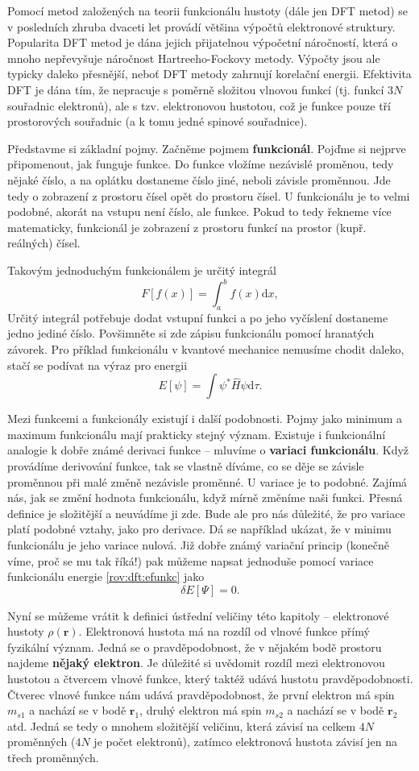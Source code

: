 Pomocí metod založených na teorii funkcionálu hustoty (dále jen DFT metod) se v posledních zhruba dvaceti let provádí většina výpočtů elektronové struktury. Popularita DFT metod je dána jejich přijatelnou výpočetní náročností, která o mnoho nepřevyšuje náročnost Hartreeho-Fockovy 
metody. Výpočty jsou ale typicky daleko přesnější, neboť DFT metody zahrnují korelační energii. Efektivita DFT je dána tím, že nepracuje s poměrně složitou vlnovou funkcí (tj. funkcí 3$N$ souřadnic elektronů), ale s tzv. elektronovou hustotou, což je funkce pouze tří prostorových souřadnic (a k tomu jedné spinové souřadnice). 

Představme si základní pojmy. Začněme pojmem \textbf{funkcionál}. Pojďme si nejprve připomenout, jak funguje funkce. Do funkce vložíme nezávislé proměnou, tedy nějaké číslo, a na oplátku dostaneme číslo jiné, neboli závisle proměnnou. Jde tedy o zobrazení z prostoru čísel opět do prostoru čísel. U funkcionálu je to velmi podobné, akorát na vstupu není číslo, ale funkce. Pokud to tedy řekneme více matematicky, funkcionál je zobrazení z prostoru funkcí na prostor (kupř. reálných) čísel.

Takovým jednoduchým funkcionálem je určitý integrál
$$
F[f(x)] = \int_a^b f(x) \mathrm{d}x, 
$$
Určitý integrál potřebuje dodat vstupní funkci a po jeho vyčíslení dostaneme jedno jediné číslo. Povšimněte si zde zápisu funkcionálu pomocí hranatých závorek.  
Pro příklad funkcionálu v kvantové mechanice nemusíme chodit daleko, stačí se podívat na výraz pro energii
$$
E[\psi] = \int \psi^*\hat{H}\psi \mathrm{d}\tau .
\label{rov:dft:efunkc}
$$


Mezi funkcemi a funkcionály existují i další podobnosti. Pojmy jako minimum a maximum funkcionálu mají prakticky stejný význam. Existuje i funkcionální analogie k dobře známé derivaci funkce -- mluvíme o \textbf{variaci funkcionálu}.
Když provádíme derivování funkce, tak se vlastně díváme, co se děje se závisle proměnnou při malé změně nezávisle proměnné.
U variace je to podobné. Zajímá nás, jak se změní hodnota funkcionálu, když mírně změníme naši funkci. Přesná definice je složitější a neuvádíme ji zde. Bude ale pro nás důležité, že pro variace platí podobné vztahy, jako pro derivace. Dá se například ukázat, že v minimu funkcionálu je jeho variace nulová. Již dobře známý variační princip (konečně víme, proč se mu tak říká!) pak můžeme napsat jednoduše pomocí variace funkcionálu energie \eqref{rov:dft:efunkc} jako
$$
\delta E[\Psi] = 0 .
$$

Nyní se můžeme vrátit k definici ústřední veličiny této kapitoly -- elektronové hustoty $\rho(\mathbf{r})$.
Elektronová hustota má na rozdíl od vlnové funkce přímý fyzikální význam. Jedná se o pravděpodobnost, že v nějakém bodě prostoru najdeme \textbf{nějaký elektron}. Je důležité si uvědomit rozdíl mezi elektronovou hustotou a čtvercem vlnové funkce, který taktéž udává hustotu pravděpodobnosti. Čtverec vlnové funkce nám udává pravděpodobnost, že první elektron má spin $m_{s1}$ a nachází se v bodě $\mathbf{r}_1$, druhý elektron má spin $m_{s2}$ a nachází se v bodě $\mathbf{r}_2$ atd. Jedná se tedy o mnohem složitější veličinu, která závisí na celkem $4N$ proměnných ($4N$ je počet elektronů), zatímco elektronová hustota závisí jen na třech proměnných.

